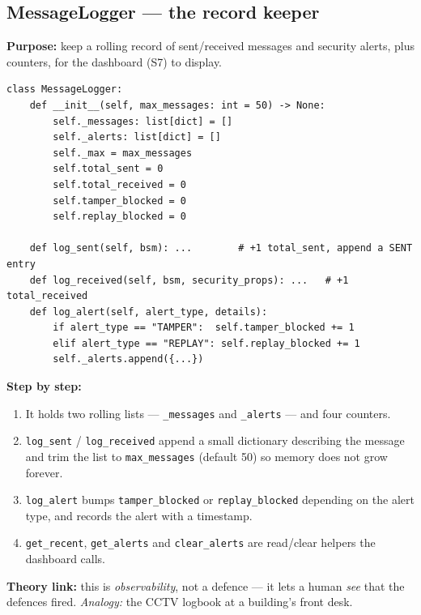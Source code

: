 \documentclass[11pt,a4paper]{report}
\begin{document}
\subsection{MessageLogger --- the record keeper}
\textbf{Purpose:} keep a rolling record of sent/received messages and security
alerts, plus counters, for the dashboard (S7) to display.
\begin{lstlisting}[style=py,caption={v2v\_protocol.py --- MessageLogger (key parts).}]
class MessageLogger:
    def __init__(self, max_messages: int = 50) -> None:
        self._messages: list[dict] = []
        self._alerts: list[dict] = []
        self._max = max_messages
        self.total_sent = 0
        self.total_received = 0
        self.tamper_blocked = 0
        self.replay_blocked = 0

    def log_sent(self, bsm): ...        # +1 total_sent, append a SENT entry
    def log_received(self, bsm, security_props): ...   # +1 total_received
    def log_alert(self, alert_type, details):
        if alert_type == "TAMPER":  self.tamper_blocked += 1
        elif alert_type == "REPLAY": self.replay_blocked += 1
        self._alerts.append({...})
\end{lstlisting}
\textbf{Step by step:}
\begin{enumerate}
  \item It holds two rolling lists --- \texttt{\_messages} and \texttt{\_alerts}
        --- and four counters.
  \item \texttt{log\_sent} / \texttt{log\_received} append a small dictionary
        describing the message and trim the list to \texttt{max\_messages}
        (default 50) so memory does not grow forever.
  \item \texttt{log\_alert} bumps \texttt{tamper\_blocked} or
        \texttt{replay\_blocked} depending on the alert type, and records the
        alert with a timestamp.
  \item \texttt{get\_recent}, \texttt{get\_alerts} and \texttt{clear\_alerts} are
        read/clear helpers the dashboard calls.
\end{enumerate}
\textbf{Theory link:} this is \emph{observability}, not a defence --- it lets a
human \emph{see} that the defences fired. \emph{Analogy:} the CCTV logbook at a
building's front desk.
\end{document}
